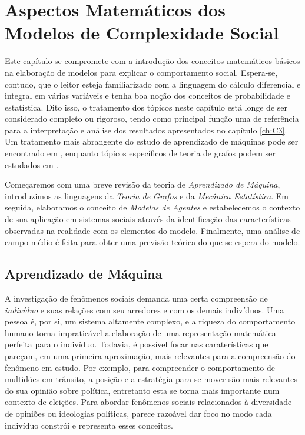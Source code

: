 

\chapter{Aspectos Matemáticos dos\\Modelos de Complexidade Social}
\label{ch:C2}

Este capítulo se compromete com a introdução dos conceitos matemáticos básicos na elaboração de modelos para explicar o comportamento social.
Espera-se, contudo, que o leitor esteja familiarizado com a linguagem do cálculo diferencial e integral em várias variáveis e tenha boa noção dos conceitos de probabilidade e estatística.
Dito isso, o tratamento dos tópicos neste capítulo está longe de ser considerado completo ou rigoroso, tendo como principal função uma de referência para a interpretação e análise dos resultados
apresentados no capítulo \ref{ch:C3}.
Um tratamento mais abrangente do estudo de aprendizado de máquinas pode ser encontrado em \parencite{Engel2001}, enquanto tópicos específicos de teoria de grafos podem ser estudados em \parencite{NewmanBook}.

Começaremos com uma breve revisão da teoria de \emph{Aprendizado de Máquina}, introduzimos as linguagens da \emph{Teoria de Grafos} e da \emph{Mecânica Estatística}.
Em seguida, elaboramos o conceito de \emph{Modelos de Agentes}
e estabelecemos o contexto de sua aplicação em sistemas sociais através da identificação das características observadas na realidade com os elementos do modelo.
Finalmente, uma análise de campo médio é feita para obter uma previsão teórica do que se espera do modelo.

\section{Aprendizado de Máquina}
\label{sec:ML}

A investigação de fenômenos sociais demanda uma certa compreensão de \emph{indivíduo} e suas relações com seu arredores e com os demais indivíduos.
Uma pessoa é, por si, um sistema altamente complexo, e a riqueza do comportamento humano torna impraticável a elaboração de uma representação matemática perfeita para o indivíduo.
Todavia, é possível focar nas caraterísticas que pareçam, em uma primeira aproximação, mais relevantes para a compreensão do fenômeno em estudo.
Por exemplo, para compreender o comportamento de multidões em trânsito, a posição e a estratégia para se mover são mais relevantes do sua opinião sobre política, entretanto esta se torna mais importante num contexto de eleições.
Para abordar fenômenos sociais relacionados à diversidade de opiniões ou ideologias políticas, parece razoável dar foco no modo cada indivíduo constrói e representa esses conceitos.

